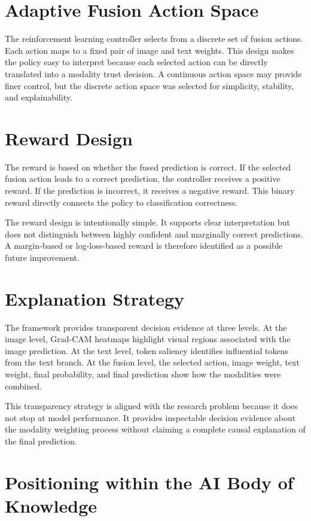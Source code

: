 \section{Adaptive Fusion Action Space}


The reinforcement learning controller selects from a discrete set of fusion actions. Each action maps to a fixed pair of image and text weights. This design makes the policy easy to interpret because each selected action can be directly translated into a modality trust decision. A continuous action space may provide finer control, but the discrete action space was selected for simplicity, stability, and explainability.


\section{Reward Design}


The reward is based on whether the fused prediction is correct. If the selected fusion action leads to a correct prediction, the controller receives a positive reward. If the prediction is incorrect, it receives a negative reward. This binary reward directly connects the policy to classification correctness.


The reward design is intentionally simple. It supports clear interpretation but does not distinguish between highly confident and marginally correct predictions. A margin-based or log-loss-based reward is therefore identified as a possible future improvement.


\section{Explanation Strategy}


The framework provides transparent decision evidence at three levels. At the image level, Grad-CAM heatmaps highlight visual regions associated with the image prediction. At the text level, token saliency identifies influential tokens from the text branch. At the fusion level, the selected action, image weight, text weight, final probability, and final prediction show how the modalities were combined.


This transparency strategy is aligned with the research problem because it does not stop at model performance. It provides inspectable decision evidence about the modality weighting process without claiming a complete causal explanation of the final prediction.


\section{Positioning within the AI Body of Knowledge}


